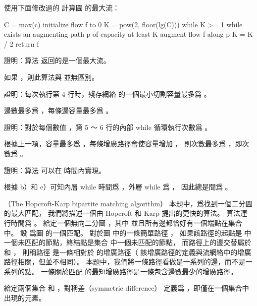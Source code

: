 使用下面修改過的  計算圖  的最大流：

\startCLRS
C = max(c)
initialize flow f to 0
K = pow(2, floor(lg(C)))
while K >= 1
	while exists an augmenting path p of capacity at least K
		augment flow f along p
	K = K / 2
return f
\stopCLRS

\startigBase[continue]\startitem
證明：算法  返回的是一個最大流。
\stopitem\stopigBase

\startANSWER
如果 ，則此算法與  並無區別。
\stopANSWER

\startigBase[continue]\startitem
證明：每次執行第 4 行時，殘存網絡  的一個最小切割容量最多爲 。
\stopitem\stopigBase

\startANSWER
邊數最多爲 ，每條邊容量最多爲 。
\stopANSWER

\startigBase[continue]\startitem
證明：對於每個數值 ，第 5 ～ 6 行的內部 {\EMP while} 循環執行次數爲 。
\stopitem\stopigBase

\startANSWER
根據上一項，容量最多爲 ，每條增廣路徑會使容量增加 ，
則次數最多爲 ，即次數爲 。
\stopANSWER

\startigBase[continue]\startitem
證明：算法  可以在  時間內實現。
\stopitem\stopigBase

\startANSWER
根據 b）和 e）可知內層 while 時間爲 ，外層 while 爲 ，
因此總是間爲 。
\stopANSWER

\stopPROBLEM

\startPROBLEM
（The Hopcroft-Karp bipartite matching algorithm）
本題中，爲找到一個二分圖的最大匹配，
我們將描述一個由 Hopcroft 和 Karp 提出的更快的算法。
算法運行時間爲 。
給定一個無向二分圖 ，其中  並且所有邊都恰好有一個端點在集合  中。
設  爲圖  的一個匹配。
對於圖  中的一條簡單路徑 ，
如果該路徑的起點是  中一個未匹配的節點，終結點是集合  中一個未匹配的節點，
而路徑上的邊交替屬於  和 ，
則稱路徑  是一條相對於  的增廣路徑（
該增廣路徑的定義與流網絡中的增廣路徑相關，但並不相同）。
本題中，我們將一條路徑看做是一系列的邊，而不是一系列的點。
一條關於匹配  的最短增廣路徑是一條包含邊數最少的增廣路徑。

給定兩個集合  和 ，{\EMP 對稱差（symmetric difference）}  定義爲
 ，即僅在一個集合中出現的元素。

